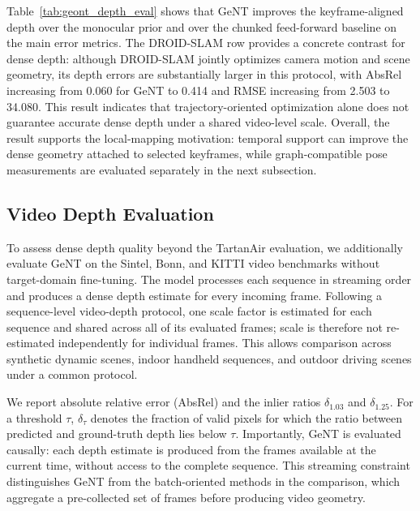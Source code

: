 Table~\ref{tab:geont_depth_eval} shows that GeNT improves the keyframe-aligned depth over the monocular prior and over the chunked feed-forward baseline on the main error metrics.
The DROID-SLAM row provides a concrete contrast for dense depth: although DROID-SLAM jointly optimizes camera motion and scene geometry, its depth errors are substantially larger in this protocol, with AbsRel increasing from 0.060 for GeNT to 0.414 and RMSE increasing from 2.503 to 34.080.
This result indicates that trajectory-oriented optimization alone does not guarantee accurate dense depth under a shared video-level scale.
Overall, the result supports the local-mapping motivation: temporal support can improve the dense geometry attached to selected keyframes, while graph-compatible pose measurements are evaluated separately in the next subsection.

\subsection{Video Depth Evaluation}
To assess dense depth quality beyond the TartanAir evaluation, we additionally evaluate GeNT on the Sintel, Bonn, and KITTI video benchmarks without target-domain fine-tuning.
The model processes each sequence in streaming order and produces a dense depth estimate for every incoming frame.
Following a sequence-level video-depth protocol, one scale factor is estimated for each sequence and shared across all of its evaluated frames; scale is therefore not re-estimated independently for individual frames.
This allows comparison across synthetic dynamic scenes, indoor handheld sequences, and outdoor driving scenes under a common protocol.

We report absolute relative error (AbsRel) and the inlier ratios $\delta_{1.03}$ and $\delta_{1.25}$.
For a threshold $\tau$, $\delta_{\tau}$ denotes the fraction of valid pixels for which the ratio between predicted and ground-truth depth lies below $\tau$.
Importantly, GeNT is evaluated causally: each depth estimate is produced from the frames available at the current time, without access to the complete sequence.
This streaming constraint distinguishes GeNT from the batch-oriented methods in the comparison, which aggregate a pre-collected set of frames before producing video geometry.

